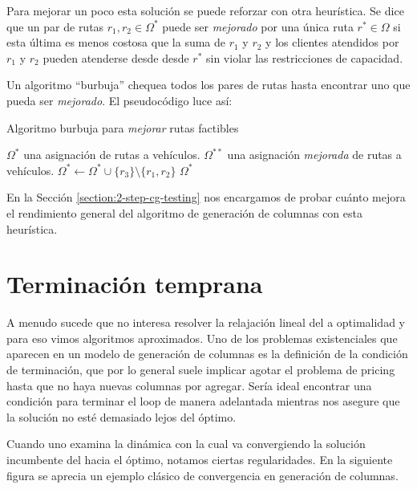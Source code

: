 Para mejorar un poco esta solución se puede reforzar con otra heurística. Se dice que un par de rutas $r_1, r_2 \in \Omega^{*}$ puede ser \emph{mejorado} por una única ruta $r^{*} \in \Omega$ si esta última es menos costosa que la suma de $r_1$ y $r_2$ y los clientes atendidos por $r_1$ y $r_2$ pueden atenderse desde desde $r^{*}$ sin violar las restricciones de capacidad.

Un algoritmo ``burbuja'' chequea todos los pares de rutas hasta encontrar uno que pueda ser \emph{mejorado}. El pseudocódigo luce así:

\begin{algorithm}[H]
  \caption{Algoritmo burbuja para \emph{mejorar} rutas factibles}
  \label{al:bubble-algorithm}
  \begin{algorithmic}[1]
  	\Require $\Omega^{*}$ una asignación de rutas a vehículos. 
  	\Ensure $\Omega^{**}$ una asignación \emph{mejorada} de rutas a vehículos. 
            \State $\Omega^{*} \gets \Omega^{*} \cup \{r_3\} \setminus \{r_1, r_2\}$
        \EndWhile
	\Return $\Omega^{*}$
  \end{algorithmic}
\end{algorithm}

En la Sección \ref{section:2-step-cg-testing} nos encargamos de probar cuánto mejora el rendimiento general del algoritmo de generación de columnas con esta heurística.

\section{Terminación temprana}
\label{section:finish-early}

A menudo sucede que no interesa resolver la relajación lineal del  a optimalidad y para eso vimos algoritmos aproximados. Uno de los problemas existenciales que aparecen en un modelo de generación de columnas es la definición de la condición de terminación, que por lo general suele implicar agotar el problema de pricing hasta que no haya nuevas columnas por agregar. Sería ideal encontrar una condición para terminar el loop de manera adelantada mientras nos asegure que la solución no esté demasiado lejos del óptimo.

Cuando uno examina la dinámica con la cual va convergiendo la solución incumbente del  hacia el óptimo, notamos ciertas regularidades. En la siguiente figura se aprecia un ejemplo clásico de convergencia en generación de columnas. 


